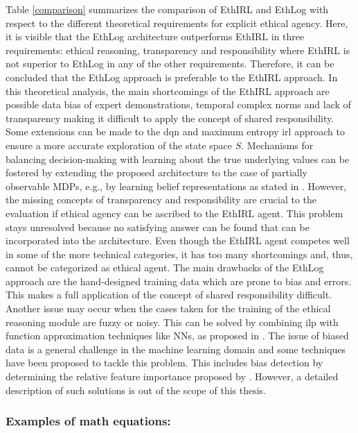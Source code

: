 Table \ref{comparison} summarizes the comparison of EthIRL and EthLog with respect to the different theoretical requirements for explicit ethical agency. Here, it is visible that the EthLog architecture outperforms EthIRL in three requirements: ethical reasoning, transparency and responsibility where EthIRL is not superior to EthLog in any of the other requirements. Therefore, it can be concluded that the EthLog approach is preferable to the EthIRL approach. In this theoretical analysis, the main shortcomings of the EthIRL approach are possible data bias of expert demonstrations, temporal complex norms and lack of transparency making it difficult to apply the concept of shared responsibility. Some extensions can be made to the \gls{dqn} and maximum entropy \gls{irl} approach to ensure a more accurate exploration of the state space $S$. Mechanisms for balancing decision-making with learning about the true underlying values can be fostered by extending the proposed architecture to the case of partially observable MDPs, e.g., by learning belief representations as stated in \cite{gangwani2020learning}. However, the missing concepts of transparency and responsibility are crucial to the evaluation if ethical agency can be ascribed to the EthIRL agent. This problem stays unresolved because no satisfying answer can be found that can be incorporated into the architecture. Even though the EthIRL agent competes well in some of the more technical categories, it has too many shortcomings and, thus, cannot be categorized as ethical agent. The main drawbacks of the EthLog approach are the hand-designed training data which are prone to bias and errors. This makes a full application of the concept of shared responsibility difficult. Another issue may occur when the cases taken for the training of the ethical reasoning module are fuzzy or noisy. This can be solved by combining \gls{ilp} with function approximation techniques like NNs, as proposed in \cite{evans2018learning, payani2019inductive}. The issue of biased data is a general challenge in the machine learning domain and some techniques have been proposed to tackle this problem. This includes bias detection by determining the relative feature importance proposed by \cite{pascanu2017}. However, a detailed description of such solutions is out of the scope of this thesis. \\


\subsubsection{Examples of math equations:}

